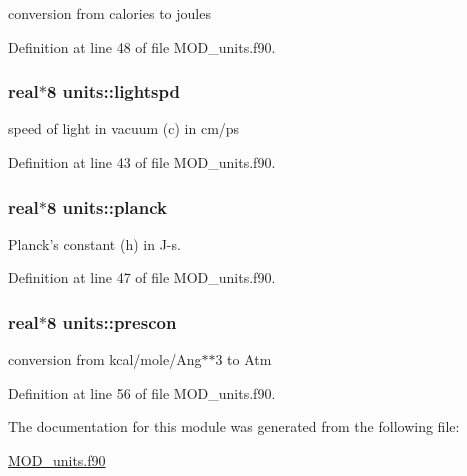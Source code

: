 conversion from calories to joules 



Definition at line 48 of file M\-O\-D\-\_\-units.\-f90.

\hypertarget{classunits_a2403d87e6803bf101270cc60d99f44bf}{
\subsubsection[{lightspd}]{\setlength{\rightskip}{0pt plus 5cm}real$\ast$8 units\-::lightspd}}\label{classunits_a2403d87e6803bf101270cc60d99f44bf}


speed of light in vacuum (c) in cm/ps 



Definition at line 43 of file M\-O\-D\-\_\-units.\-f90.

\hypertarget{classunits_a89f1a1ae7ff5ffa457cd0f11b2ddfb60}{
\subsubsection[{planck}]{\setlength{\rightskip}{0pt plus 5cm}real$\ast$8 units\-::planck}}\label{classunits_a89f1a1ae7ff5ffa457cd0f11b2ddfb60}


Planck's constant (h) in J-\/s. 



Definition at line 47 of file M\-O\-D\-\_\-units.\-f90.

\hypertarget{classunits_a233a5b243e897ecb5ef38f2a0df18efa}{
\subsubsection[{prescon}]{\setlength{\rightskip}{0pt plus 5cm}real$\ast$8 units\-::prescon}}\label{classunits_a233a5b243e897ecb5ef38f2a0df18efa}


conversion from kcal/mole/\-Ang$\ast$$\ast$3 to Atm 



Definition at line 56 of file M\-O\-D\-\_\-units.\-f90.



The documentation for this module was generated from the following file\-:\begin{DoxyCompactItemize}
\item 
\hyperlink{MOD__units_8f90}{M\-O\-D\-\_\-units.\-f90}\end{DoxyCompactItemize}
